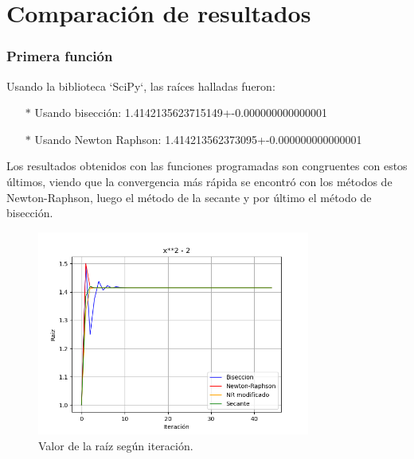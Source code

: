 \documentclass[titlepage,a4paper]{article}
\begin{document}
\section{Comparación de resultados}\label{sec:comparacion_resultados}
\subsubsection{Primera función}\label{sec:CR1}

Usando la biblioteca `SciPy`, las raíces halladas fueron:
\begin{itemize}
    \item[$*$]Usando bisección:  1.4142135623715149+-0.000000000000001
    \item[$*$]Usando Newton Raphson:  1.414213562373095+-0.000000000000001
\end{itemize}

Los resultados obtenidos con las funciones programadas son congruentes con estos últimos, viendo que la convergencia más rápida se encontró con los métodos de Newton-Raphson, luego el método de la secante y por último el método de bisección.

\begin{figure}[H]
\centering
\includegraphics[width=0.8\textwidth]{raiz f1.png}
\caption{\label{fig:class01}Valor de la raíz según iteración.}
\end{figure}
\end{document}
